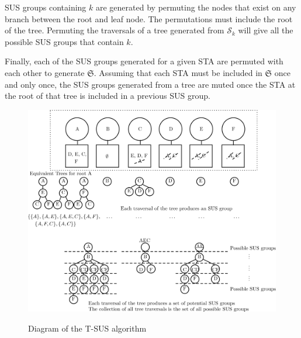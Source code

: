 SUS groups containing $k$ are generated by permuting the nodes that exist on any branch between the root and leaf node. The permutations must include the root of the tree. Permuting the traversals of a tree generated from $\mathcal{S}_k$ will give all the possible SUS groups that contain $k$.

Finally, each of the SUS groups generated for a given STA are permuted with each other to generate $\mathfrak{S}$. Assuming that each STA must be included in $\mathfrak{S}$ once and only once, the SUS groups generated from a tree are muted once the STA at the root of that tree is included in a previous SUS group.

\begin{figure}
    \includegraphics[width=16cm]{figs/exhastive_tree_alg.png}\\
    \caption{Diagram of the T-SUS algorithm}
    \label{fig:tree_alg}
\end{figure}